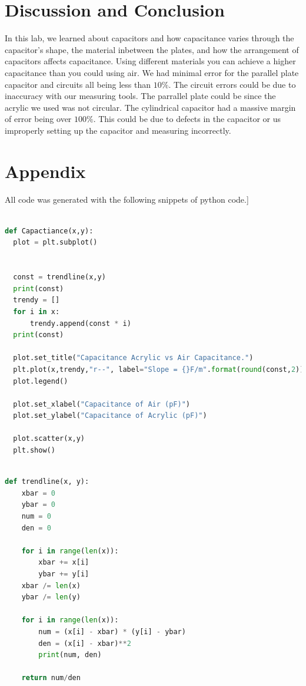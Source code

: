 \documentclass[10pt]{article}
\begin{document}
\section{Discussion and Conclusion}
In this lab, we learned about capacitors and how capacitance varies through the capacitor's shape,
the material inbetween the plates, and how the arrangement of capacitors affects capacitance. Using 
different materials you can achieve a higher capacitance than you could using air. We had minimal error 
for the parallel plate capacitor and circuits all being less than $10\%$. The circuit errors could be 
due to inaccuracy with our measuring tools. The parrallel plate could be since the acrylic we used 
was not circular. The cylindrical capacitor had a massive margin of error being over $100\%$. This 
could be due to defects in the capacitor or us improperly setting up the capacitor and measuring 
incorrectly.\\
\section*{Appendix}\newpage

All code was generated with the following snippets of python code.]

\begin{lstlisting}[language=Python, caption={Python code for generating Capacitance of air vs Acrylic}]

def Capactiance(x,y):
  plot = plt.subplot()


  const = trendline(x,y)
  print(const)
  trendy = []
  for i in x:
      trendy.append(const * i)
  print(const)

  plot.set_title("Capacitance Acrylic vs Air Capacitance.")
  plt.plot(x,trendy,"r--", label="Slope = {}F/m".format(round(const,2)))
  plot.legend()

  plot.set_xlabel("Capacitance of Air (pF)")
  plot.set_ylabel("Capacitance of Acrylic (pF)")

  plot.scatter(x,y)
  plt.show()  

  \end{lstlisting}

\begin{lstlisting}[language=Python, caption={Python code for generating the slope of the trend line}]

def trendline(x, y):
    xbar = 0
    ybar = 0
    num = 0
    den = 0

    for i in range(len(x)):
        xbar += x[i]
        ybar += y[i]
    xbar /= len(x)
    ybar /= len(y)

    for i in range(len(x)):
        num = (x[i] - xbar) * (y[i] - ybar)
        den = (x[i] - xbar)**2
        print(num, den)

    return num/den

  \end{lstlisting}


\end{document}
